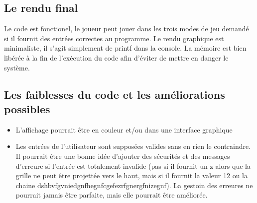 \documentclass[12pt]{article}
\begin{document}
\subsection{Le rendu final}

Le code est fonctionel, le joueur peut jouer dans les trois modes de jeu demandé si il fournit des entrées correctes au programme. Le rendu graphique est minimaliste, il s'agit simplement de printf dans la console. La mémoire est bien libérée à la fin de l'exécution du code afin d'éviter de mettre en danger le système. 

\subsection{Les faiblesses du code et les améliorations possibles}

\begin{itemize}
    \item L'affichage pourrait être en couleur et/ou dans une interface graphique
    \item Les entrées de l'utilisateur sont supposées valides sans en rien le contraindre. Il pourrait être une bonne idée d'ajouter des sécurités et des messages d'erreure si l'entrée est totalement invalide (pas si il fournit un z alors que la grille ne peut être projettée vers le haut, mais si il fournit la valeur 12 ou la chaine dshbvfgvniedgnfhegnfcgefezrfgnergfnizegnf). La gestoin des erreures ne pourrait jamais être parfaite, mais elle pourrait être améliorée.
\end{itemize}
\end{document}
